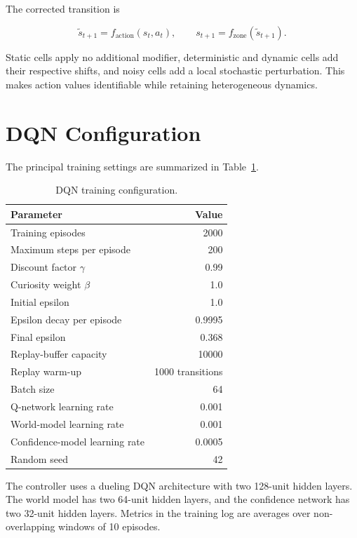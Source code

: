 \documentclass[11pt,a4paper]{article}
\begin{document}
The corrected transition is

\begin{equation}
    \tilde{s}_{t+1} = f_{\mathrm{action}}(s_t,a_t),
    \qquad
    s_{t+1} = f_{\mathrm{zone}}(\tilde{s}_{t+1}).
\end{equation}

Static cells apply no additional modifier, deterministic and dynamic cells add
their respective shifts, and noisy cells add a local stochastic perturbation.
This makes action values identifiable while retaining heterogeneous dynamics.

\section{DQN Configuration}

The principal training settings are summarized in
Table~\ref{tab:training-config}.

\begin{table}[ht]
    \centering
    \caption{DQN training configuration.}
    \label{tab:training-config}
    \begin{tabular}{lr}
        \toprule
        Parameter & Value \\
        \midrule
        Training episodes & 2000 \\
        Maximum steps per episode & 200 \\
        Discount factor $\gamma$ & 0.99 \\
        Curiosity weight $\beta$ & 1.0 \\
        Initial epsilon & 1.0 \\
        Epsilon decay per episode & 0.9995 \\
        Final epsilon & 0.368 \\
        Replay-buffer capacity & 10000 \\
        Replay warm-up & 1000 transitions \\
        Batch size & 64 \\
        Q-network learning rate & 0.001 \\
        World-model learning rate & 0.001 \\
        Confidence-model learning rate & 0.0005 \\
        Random seed & 42 \\
        \bottomrule
    \end{tabular}
\end{table}

The controller uses a dueling DQN architecture with two 128-unit hidden layers.
The world model has two 64-unit hidden layers, and the confidence network has
two 32-unit hidden layers. Metrics in the training log are averages over
non-overlapping windows of 10 episodes.
\end{document}
